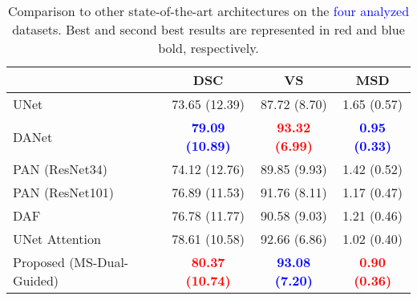 \documentclass[journal]{IEEEtran}
\begin{document}
\begin{table}[t!]
\begin{tabular}{lccc}
\midrule
& \textbf{DSC} & \textbf{VS} & \textbf{MSD}\\
 \midrule
UNet \cite{ronneberger2015u}  & 73.65 (12.39) & 87.72 (8.70) & 1.65 (0.57)\\
DANet \cite{fu2018dual}  &  \textcolor{blue}{\textbf{79.09 (10.89)}} & \textcolor{red}{\textbf{93.32 (6.99)}} &  \textcolor{blue}{\textbf{0.95 (0.33)}} \\
PAN (ResNet34) \cite{li2018pyramid}    &  74.12 (12.76) & 89.85 (9.93) &  1.42 (0.52) \\
PAN (ResNet101)\cite{li2018pyramid}   &  76.89 (11.53)  & 91.76 (8.11) & 1.17 (0.47) \\
DAF \cite{wang18d}  &  76.78 (11.77) & 90.58 (9.03) &  1.21 (0.46) \\
UNet Attention \cite{schlemper2019attention} &   78.61 (10.58) & 92.66 (6.86) & 1.02 (0.40) \\
Proposed (MS-Dual-Guided)  &   \textcolor{red}{\textbf{80.37 (10.74)}} & \textcolor{blue}{\textbf{93.08 (7.20)}} &  \textcolor{red}{\textbf{0.90 (0.36)}}\\
\midrule
\end{tabular}

\caption{Comparison to other state-of-the-art architectures on the \textcolor{blue}{four analyzed} datasets. Best and second best results are represented in red and blue bold, respectively. }
\label{table:sota_comp}
\end{table}
\end{document}
